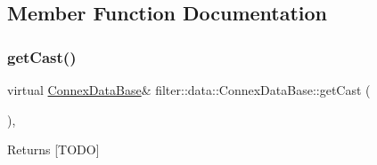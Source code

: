 \subsection{Member Function Documentation}
\mbox{\label{classfilter_1_1data_1_1_connex_data_base_a7c009f9bb553638dd3a0031a8f04b044}} 
\subsubsection{\texorpdfstring{get\+Cast()}{getCast()}}
{\footnotesize\ttfamily virtual \hyperlink{classfilter_1_1data_1_1_connex_data_base}{Connex\+Data\+Base}\& filter\+::data\+::\+Connex\+Data\+Base\+::get\+Cast (\begin{DoxyParamCaption}{ }\end{DoxyParamCaption})\hspace{0.3cm}{\ttfamily [inline]}, {\ttfamily [virtual]}}

\begin{DoxyReturn}{Returns}
\mbox{[}T\+O\+DO\mbox{]} 
\end{DoxyReturn}


